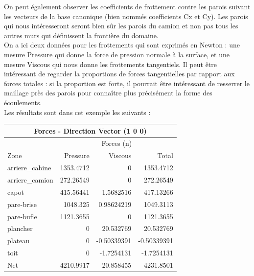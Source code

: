 On peut également observer les coefficients de frottement contre les parois suivant les vecteurs de la base canonique (bien nommés coefficients Cx et Cy). Les parois qui nous intéresseront seront bien sûr les parois du camion et non pas tous les autres murs qui définissent la frontière du domaine. \\
On a ici deux données pour les frottements qui sont exprimés en Newton : une mesure Pressure qui donne la force de pression normale à la surface, et une mesure Viscous qui nous donne les frottements tangentiels. Il peut être intéressant de regarder la proportions de forces tangentielles par rapport aux forces totales : si la proportion est forte, il pourrait être intéressant de resserrer le maillage près des parois pour connaître plus précisément la forme des écoulements.\\
Les résultats sont dans cet exemple les suivants :
\begin{center}\begin{tabular}{|l|r r r|}
\hline
\multicolumn{4}{|c|}{Forces - Direction Vector (1 0 0)} \\
\hline
		&   \multicolumn{3}{c|}{Forces (n)} \\
\hline
Zone                &     Pressure    &   Viscous     &   Total      \\
\hline
arriere\_cabine      &     1353.4712   &   0           &   1353.4712  \\
arriere\_camion     &      272.26549   &   0           &   272.26549  \\ 
capot               &     415.56441    &  1.5682516    &  417.13266   \\
pare-brise          &     1048.325     &  0.98624219   &  1049.3113   \\
pare-bufle          &     1121.3655    &  0            &  1121.3655   \\
plancher            &     0            &  20.532769    &  20.532769   \\
plateau             &     0            &  -0.50339391  &  -0.50339391 \\
toit                &     0            &  -1.7254131   &  -1.7254131  \\
\hline
\hline
Net                 &     4210.9917    &  20.858455    &  4231.8501   \\
\hline
\end{tabular}\end{center}

